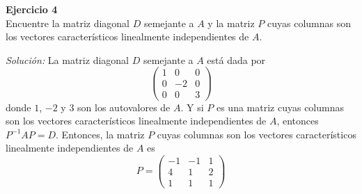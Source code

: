 \documentclass{article}
\newenvironment{problem}[2][Ejercicio]
    { \begin{mdframed}[backgroundcolor=gray!20] \textbf{#1 #2} \\}
    {  \end{mdframed}}
\newenvironment{solution}
    {\textit{Solución:}}
    {}
\begin{document}
\begin{problem}{4}
    Encuentre la matriz diagonal $D$ semejante a $A$ y la matriz $P$ cuyas columnas son los vectores característicos linealmente independientes de $A$.
\end{problem}
\begin{solution}
    La matriz diagonal $D$ semejante a $A$ está dada por
    $$
    \begin{pmatrix}
    1 & 0 & 0 \\
    0 & -2 & 0 \\
    0 & 0 & 3
    \end{pmatrix}
    $$
    donde $1$, $-2$ y $3$ son los autovalores de $A$. Y si $P$ es una matriz cuyas columnas son los vectores característicos linealmente independientes de $A$, entonces $P^{-1}AP = D$. Entonces, la matriz $P$ cuyas columnas son los vectores característicos linealmente independientes de $A$ es
    $$
    P = \begin{pmatrix}
    -1 & -1 & 1 \\
    4 & 1 & 2 \\
    1 & 1 & 1
    \end{pmatrix}
    $$
\end{solution}

    

\end{document}
